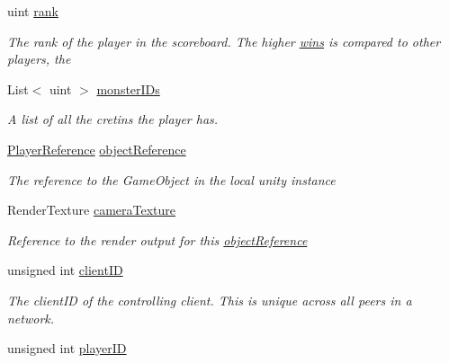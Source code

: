 \begin{DoxyCompactItemize}
uint \hyperlink{class_game_state_1_1_player_a6cf0778cc27a824eac211b8b29b3dfcc}{rank}
\begin{DoxyCompactList}\small\item\em The rank of the player in the scoreboard. The higher \hyperlink{class_game_state_1_1_player_a3a4d13459cad9bd58e058ddc6387af70}{wins} is compared to other players, the \end{DoxyCompactList}\item 
List$<$ uint $>$ \hyperlink{class_game_state_1_1_player_a2c4ed3c60a2969cd4f891e12c8265377}{monster\-I\-Ds}
\begin{DoxyCompactList}\small\item\em A list of all the cretins the player has. \end{DoxyCompactList}\item 
\hyperlink{class_player_reference}{Player\-Reference} \hyperlink{class_game_state_1_1_player_aebf24de01e14055dc940d0493753484f}{object\-Reference}
\begin{DoxyCompactList}\small\item\em The reference to the Game\-Object in the local unity instance \end{DoxyCompactList}\item 
Render\-Texture \hyperlink{class_game_state_1_1_player_ac1f7e0b5bc335c32c3be71e3653787a6}{camera\-Texture}
\begin{DoxyCompactList}\small\item\em Reference to the render output for this \hyperlink{class_game_state_1_1_player_aebf24de01e14055dc940d0493753484f}{object\-Reference} \end{DoxyCompactList}\item 
\hypertarget{class_game_state_1_1_player_a1bef4cd92306bd5cf330c4756e63686c}{unsigned int \hyperlink{class_game_state_1_1_player_a1bef4cd92306bd5cf330c4756e63686c}{client\-I\-D}}\label{class_game_state_1_1_player_a1bef4cd92306bd5cf330c4756e63686c}

\begin{DoxyCompactList}\small\item\em The client\-I\-D of the controlling client. This is unique across all peers in a network. \end{DoxyCompactList}\item 
\hypertarget{class_game_state_1_1_player_ac71d68698435ee1c625237b1f2b377cb}{unsigned int \hyperlink{class_game_state_1_1_player_ac71d68698435ee1c625237b1f2b377cb}{player\-I\-D}}\label{class_game_state_1_1_player_ac71d68698435ee1c625237b1f2b377cb}


\end{DoxyCompactItemize}
